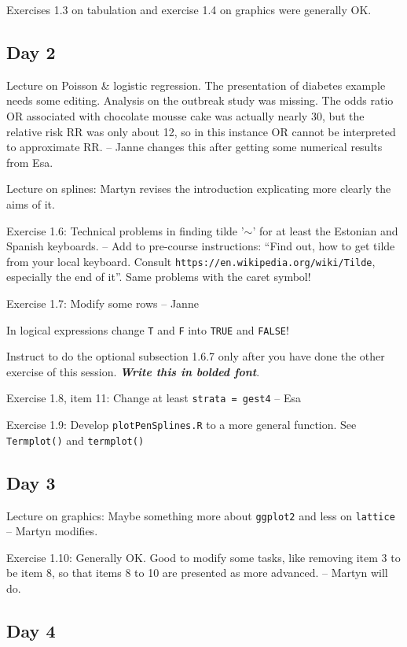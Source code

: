 Exercises 1.3 on tabulation and exercise 1.4 on graphics were generally OK. 

\subsection*{Day 2}

Lecture on Poisson \& logistic regression. 
The presentation of diabetes example needs some editing.
Analysis on the outbreak study was missing. 
The odds ratio OR associated with chocolate mousse cake was actually nearly 30, but the relative risk RR was only about 12, so in this instance OR cannot be interpreted to approximate RR.
-- Janne changes this after getting some numerical results from Esa.

Lecture on splines: Martyn revises the introduction explicating more clearly the aims of it.

Exercise 1.6: Technical problems in finding tilde '$\sim$' for at least the Estonian and Spanish keyboards. -- Add to pre-course instructions: ``Find out, how to get tilde from your local keyboard. Consult \verb|https://en.wikipedia.org/wiki/Tilde|, especially the end of it''.
Same problems with the caret symbol!

Exercise 1.7: Modify some rows -- Janne

In logical expressions change {\tt T} and {\tt F} into {\tt TRUE} and {\tt FALSE}!

Instruct to do the optional subsection 1.6.7 only after you have done the other exercise of this session. \textbf{\textit{Write this in bolded font}}.

Exercise 1.8, item 11: Change at least {\tt strata = gest4} -- Esa

Exercise 1.9: Develop {\tt plotPenSplines.R} to a more general function.
See {\tt Termplot()} and {\tt termplot()} 

\subsection*{Day 3}

Lecture on graphics: Maybe something more about {\tt ggplot2} 
and less on {\tt lattice} -- Martyn modifies.

Exercise 1.10: Generally OK. Good to modify some tasks, like removing item 3 to be item 8, so that items 8 to 10 are presented as more advanced. -- Martyn will do.

\subsection*{Day 4}

